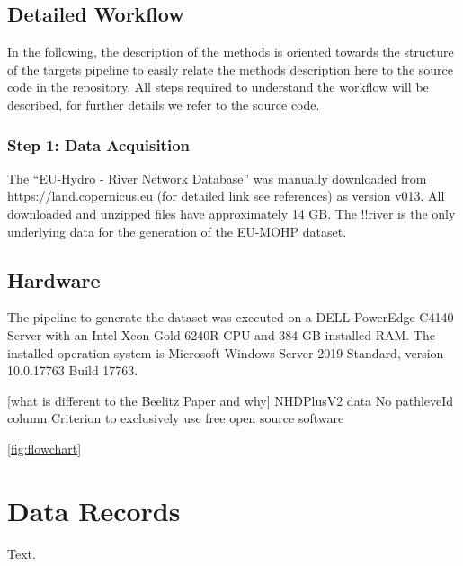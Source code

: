 \documentclass[fleqn,10pt]{wlscirep}
\begin{document}
\hypertarget{detailed-workflow}{%
\subsection*{Detailed Workflow}\label{detailed-workflow}}

In the following, the description of the methods is oriented towards the structure of the targets pipeline to easily relate the methods description here to the source code in the repository. All steps required to understand the workflow will be described, for further details we refer to the source code.

\hypertarget{step-1-data-acquisition}{%
\subsubsection*{Step 1: Data Acquisition}\label{step-1-data-acquisition}}

The ``EU-Hydro - River Network Database'' was manually downloaded from \url{https://land.copernicus.eu} (for detailed link see references) as version v013. All downloaded and unzipped files have approximately 14 GB. The !!river is the only underlying data for the generation of the EU-MOHP dataset.

\hypertarget{hardware}{%
\subsection*{Hardware}\label{hardware}}

The pipeline to generate the dataset was executed on a DELL PowerEdge C4140 Server with an Intel Xeon Gold 6240R CPU and 384 GB installed RAM. The installed operation system is Microsoft Windows Server 2019 Standard, version 10.0.17763 Build 17763.

{[}what is different to the Beelitz Paper and why{]}
NHDPlusV2 data
No pathleveId column
Criterion to exclusively use free open source software

\ref{fig:flowchart}

\hypertarget{data-records}{%
\section*{Data Records}\label{data-records}}

Text.
\end{document}
